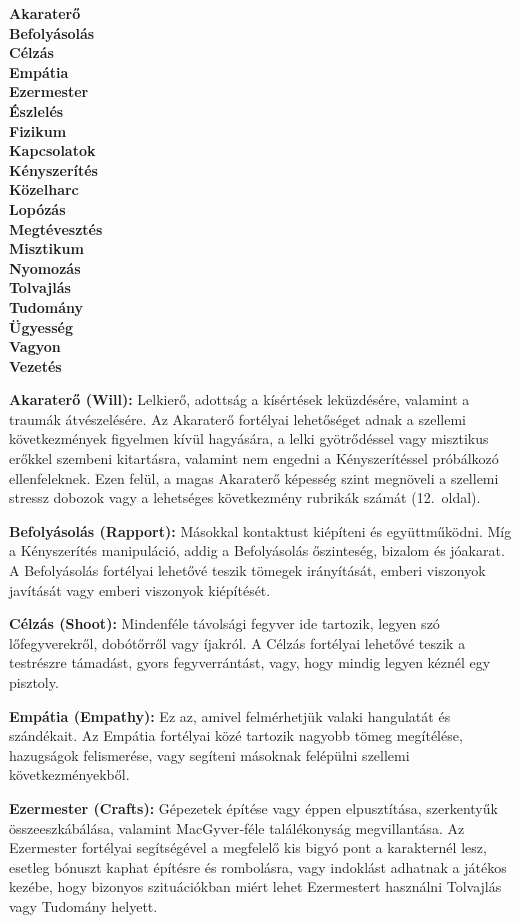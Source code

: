\documentclass[oneside]{book}
\newcommand{\page}[1]{#1.~oldal}
\begin{document}
\begin{multicols}{5}
\textbf{
Akaraterő \\
Befolyásolás \\
Célzás \\
Empátia \\
Ezermester \\
Észlelés \\
Fizikum \\
Kapcsolatok \\
Kényszerítés \\
Közelharc \\
Lopózás \\
Megtévesztés \\
Misztikum \\
Nyomozás \\
Tolvajlás \\
Tudomány \\
Ügyesség \\
Vagyon \\
Vezetés
}
\end{multicols}

\textbf{Akaraterő (Will):} Lelkierő, adottság a kísértések leküzdésére, valamint a traumák átvészelésére. Az Akaraterő fortélyai lehetőséget adnak a szellemi következmények figyelmen kívül hagyására, a lelki gyötrődéssel vagy misztikus erőkkel szembeni kitartásra, valamint nem engedni a Kényszerítéssel próbálkozó ellenfeleknek. Ezen felül, a magas Akaraterő képesség szint megnöveli a szellemi stressz dobozok vagy a lehetséges következmény rubrikák számát (\page{12}).

\textbf{Befolyásolás (Rapport):} Másokkal kontaktust kiépíteni és együttműködni. Míg a Kényszerítés manipuláció, addig a Befolyásolás őszinteség, bizalom és jóakarat. A Befolyásolás fortélyai lehetővé teszik tömegek irányítását, emberi viszonyok javítását vagy emberi viszonyok kiépítését.

\textbf{Célzás (Shoot):} Mindenféle távolsági fegyver ide tartozik, legyen szó lőfegyverekről, dobótőrről vagy íjakról. A Célzás fortélyai lehetővé teszik a testrészre támadást, gyors fegyverrántást, vagy, hogy mindig legyen kéznél egy pisztoly.

\textbf{Empátia (Empathy):} Ez az, amivel felmérhetjük valaki hangulatát és szándékait. Az Empátia fortélyai közé tartozik nagyobb tömeg megítélése, hazugságok felismerése, vagy segíteni másoknak felépülni szellemi következményekből.

\textbf{Ezermester (Crafts):} Gépezetek építése vagy éppen elpusztítása, szerkentyűk összeeszkábálása, valamint MacGyver‑féle találékonyság megvillantása. Az Ezermester fortélyai segítségével a megfelelő kis bigyó pont a karakternél lesz, esetleg bónuszt kaphat építésre és rombolásra, vagy indoklást adhatnak a játékos kezébe, hogy bizonyos szituációkban miért lehet Ezermestert használni Tolvajlás vagy Tudomány helyett.
\end{document}
